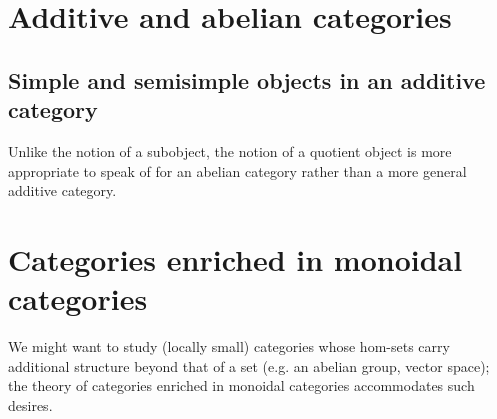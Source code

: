 \section{Additive and abelian categories}




% 

\subsection{Simple and semisimple objects in an additive category}



Unlike the notion of a subobject, the notion of a quotient object is more appropriate to speak of for an abelian category rather than a more general additive category.













\section{Categories enriched in monoidal categories}


We might want to study (locally small) categories whose hom-sets carry additional structure beyond that of a set (e.g. an abelian group, vector space); the theory of categories enriched in monoidal categories accommodates such desires.

